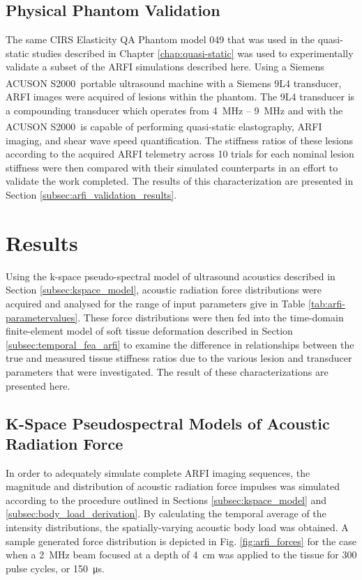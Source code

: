 		\FloatBarrier
		\subsection{Physical Phantom Validation}
		\label{subsec:arfi_physical_phantom}
			The same CIRS Elasticity QA Phantom model 049 that was used in the quasi-static studies described in Chapter \ref{chap:quasi-static} was used to experimentally validate a subset of the ARFI simulations described here. Using a Siemens ACUSON S2000\textsuperscript{\texttrademark}\ portable ultrasound machine with a Siemens 9L4 transducer, ARFI images were acquired of lesions within the phantom. The 9L4 transducer is a compounding transducer which operates from \SI{4}{\MHz} -- \SI{9}{\MHz} and with the ACUSON S2000\textsuperscript{\texttrademark}\ is capable of performing quasi-static elastography, ARFI imaging, and shear wave speed quantification. The stiffness ratios of these lesions according to the acquired ARFI telemetry across 10 trials for each nominal lesion stiffness were then compared with their simulated counterparts in an effort to validate the work completed. The results of this characterization are presented in Section \ref{subsec:arfi_validation_results}.

	\section{Results}
	\label{sec:arfi_results}
		Using the k-space pseudo-spectral model of ultrasound acoustics described in Section \ref{subsec:kspace_model}, acoustic radiation force distributions were acquired and analysed for the range of input parameters give in Table \ref{tab:arfi-parametervalues}. These force distributions were then fed into the time-domain finite-element model of soft tissue deformation described in Section \ref{subsec:temporal_fea_arfi} to examine the difference in relationships between the true and measured tissue stiffness ratios due to the various lesion and transducer parameters that were investigated. The result of these characterizations are presented here.

		\subsection{K-Space Pseudospectral Models of Acoustic Radiation Force}
		\label{subsec:kspace_results}
			In order to adequately simulate complete ARFI imaging sequences, the magnitude and distribution of acoustic radiation force impulses was simulated according to the procedure outlined in Sections \ref{subsec:kspace_model} and \ref{subsec:body_load_derivation}. By calculating the temporal average of the intensity distributions, the spatially-varying acoustic body load was obtained. A sample generated force distribution is depicted in Fig. \ref{fig:arfi_forces} for the case when a \SI{2}{\MHz} beam focused at a depth of \SI{4}{\cm} was applied to the tissue for 300 pulse cycles, or \SI{150}{\us}.


